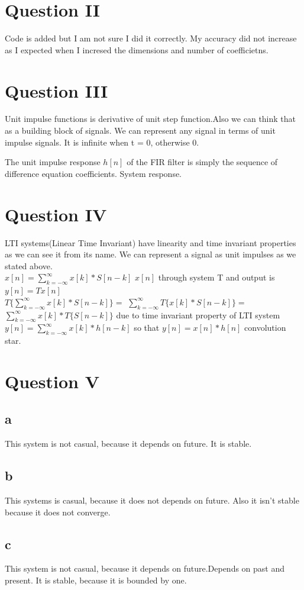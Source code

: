 \documentclass[a4paper, 12pt, titlepage]{article}
\begin{document}
\section{Question II}
Code is added but I am not sure I did it correctly. My accuracy did not increase as I expected when I incresed the dimensions and number of coefficietns.
\section{Question III}
Unit impulse functions is derivative of unit step function.Also we can think that as a building block of signals. We can represent any 
signal in terms of unit impulse signals. It is infinite when t = 0, otherwise 0.

The unit impulse response $ h[n] $ of the FIR filter is simply the sequence of difference equation coefficients. System response.

\section{Question IV}
LTI systems(Linear Time Invariant) have linearity and time invariant properties as we can see it from its name.
We can represent a signal as unit impulses as we stated above. \\
 $ x[n] = \sum_{k=-\infty}^{\infty} x[k]*S[n-k] $
 $ x[n]$ through system T and output is $ y[n] = T{x[n]} $ \\
 $ {T} \{\sum_{k=-\infty}^{\infty} x[k]*S[n-k]\} = $ 
 $ \sum_{k=-\infty}^{\infty} {T} \{ x[k]*S[n-k] \} = $ 
 $\sum_{k=-\infty}^{\infty} x[k]*{T}\{S[n-k]\}  $ 
  due to time invariant property of LTI system
  $ y[n] =  \sum_{k=-\infty}^{\infty} x[k]*h[n-k]$ so that
  $ y[n] = x[n] * h[n] $ convolution star.
\section{Question V}

\subsection{a}
This system is not casual, because it depends on future. It is stable.
\subsection{b}
This systems is casual, because it does not depends on future. Also it isn't stable because it does not converge.
\subsection{c}
This system is not casual, because it depends on future.Depends on past and present. It is stable, because it is bounded by one.
\end{document}
